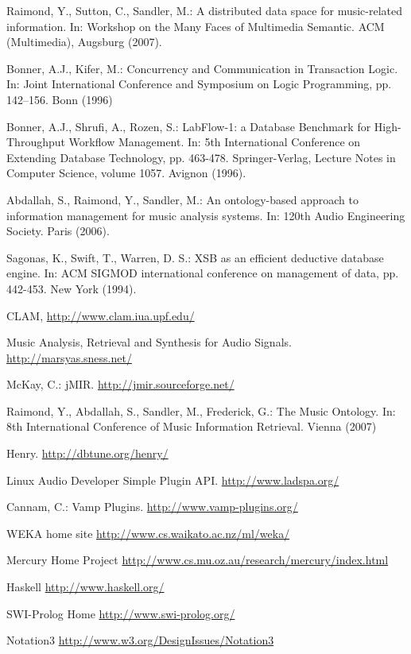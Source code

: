 \documentclass[runningheads]{llncs}
\begin{document}
\begin{thebibliography}{4}

 Raimond, Y., Sutton, C., Sandler, M.: A distributed data space for music-related information. In: Workshop on the Many Faces of Multimedia Semantic. ACM (Multimedia), Augsburg (2007).

 Bonner, A.J., Kifer, M.: Concurrency and Communication in Transaction Logic. In: Joint International Conference and Symposium on Logic Programming, pp. 142--156. Bonn (1996)

 Bonner, A.J., Shrufi, A., Rozen, S.: LabFlow-1: a Database Benchmark for High-Throughput Workflow Management. In: 5th International Conference on Extending Database Technology, pp. 463-478. Springer-Verlag, Lecture Notes in Computer Science, volume 1057. Avignon (1996).

 Abdallah, S., Raimond, Y., Sandler, M.: An ontology-based approach to information management for music analysis systems. In: 120th Audio Engineering Society. Paris (2006).

 Sagonas, K., Swift, T., Warren, D. S.: {XSB} as an efficient deductive database engine. In: ACM SIGMOD international conference on management of data, pp. 442-453. New York (1994).

 CLAM, \url{http://www.clam.iua.upf.edu/}

 Music Analysis, Retrieval and Synthesis for Audio Signals. \url{http://marsyas.sness.net/}

 McKay, C.: jMIR. \url{http://jmir.sourceforge.net/}

 Raimond, Y., Abdallah, S., Sandler, M., Frederick, G.: The Music Ontology. In: 8th International Conference of Music Information Retrieval. Vienna (2007)

 Henry. \url{http://dbtune.org/henry/} 

 Linux Audio Developer Simple Plugin API. \url{http://www.ladspa.org/}

 Cannam, C.: Vamp Plugins. \url{http://www.vamp-plugins.org/}

 WEKA home site \url{http://www.cs.waikato.ac.nz/ml/weka/}

 Mercury Home Project \url{http://www.cs.mu.oz.au/research/mercury/index.html}

 Haskell \url{http://www.haskell.org/}

 SWI-Prolog Home \url{http://www.swi-prolog.org/}

 Notation3 \url{http://www.w3.org/DesignIssues/Notation3}

\end{thebibliography}
\end{document}
